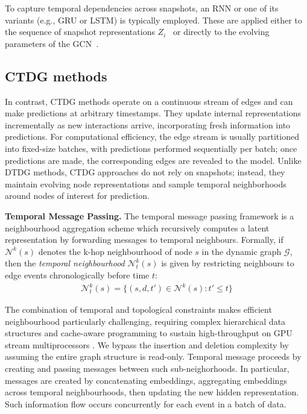To capture temporal dependencies across snapshots, an RNN or one of its variants (e.g., GRU or LSTM) is typically employed. These are applied either to the sequence of snapshot representations $Z_i$~\citep{t-gcn,gclstm,DBLP:conf/iclr/ShamsiPHNCA24} or directly to the evolving parameters of the GCN~\citep{DBLP:conf/aaai/ParejaDCMSKKSL20}.

\subsection{CTDG methods} \label{app:CTDG}

In contrast, CTDG methods operate on a continuous stream of edges and can make predictions at arbitrary timestamps. They update internal representations incrementally as new interactions arrive, incorporating fresh information into predictions. For computational efficiency, the edge stream is usually partitioned into fixed-size batches, with predictions performed sequentially per batch; once predictions are made, the corresponding edges are revealed to the model. Unlike DTDG methods, CTDG approaches do not rely on snapshots; instead, they maintain evolving node representations and sample temporal neighborhoods around nodes of interest for prediction.

\textbf{Temporal Message Passing.}
The temporal message passing framework is a neighbourhood aggregation scheme which recursively computes a latent representation by forwarding messages to temporal neighbours. Formally, if $\mathcal{N}^k(s)$ denotes the k-hop neighbourhood of node $s$ in the dynamic graph $\mathcal{G}$, then the \textit{temporal neighbourhood} $\mathcal{N}^k_t(s)$ is given by restricting neighbours to edge events chronologically before time $t$:
\begin{align}
    \mathcal{N}^k_t(s) = \{(s, d, t') \in \mathcal{N}^k(s) : t' \leq t \}
\end{align}

The combination of temporal and topological constraints makes efficient neighbourhood particularly challenging, requiring complex hierarchical data structures and cache-aware programming to sustain high-throughput on GPU stream multiprocessors \cite{lpma, gpma}. We bypass the insertion and deletion complexity by assuming the entire graph structure is read-only. Temporal message proceeds by creating and passing messages between such sub-neighorhoods. In particular, messages are created by concatenating embeddings, aggregating embeddings across temporal neighbourhoods, then updating the new hidden representation. Such information flow occurs concurrently for each event in a batch of data. 

